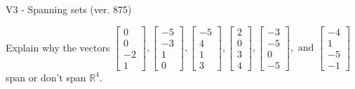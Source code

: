 \begin{exercise}
  \begin{exerciseTitle}V3 - Spanning sets (ver. 875)\end{exerciseTitle}
  \begin{exerciseStatement}
    Explain why the vectors \(\left[\begin{array}{r}
0 \\
0 \\
-2 \\
1
\end{array}\right] , \left[\begin{array}{r}
-5 \\
-3 \\
1 \\
0
\end{array}\right] , \left[\begin{array}{r}
-5 \\
4 \\
1 \\
3
\end{array}\right] , \left[\begin{array}{r}
2 \\
0 \\
3 \\
4
\end{array}\right] , \left[\begin{array}{r}
-3 \\
-5 \\
0 \\
-5
\end{array}\right] , \text{ and } \left[\begin{array}{r}
-4 \\
1 \\
-5 \\
-1
\end{array}\right]\) span or don't span \(\mathbb{R}^4\). 
	



\end{exerciseStatement}
\end{exercise}

